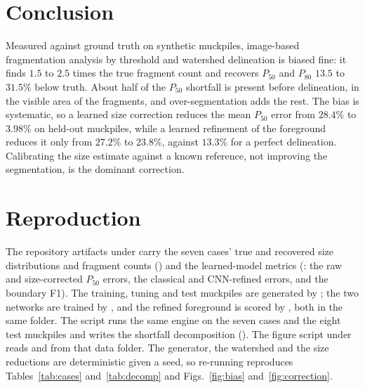 \documentclass[journal]{IEEEtran}
\begin{document}
\section{Conclusion}

Measured against ground truth on synthetic muckpiles, image-based fragmentation analysis by threshold and watershed
delineation is biased fine: it finds $1.5$ to $2.5$ times the true fragment count and recovers $P_{50}$ and $P_{80}$
$13.5$ to $31.5\%$ below truth. About half of the $P_{50}$ shortfall is present before delineation, in the visible
area of the fragments, and over-segmentation adds the rest. The bias is systematic, so a learned size correction
reduces the mean $P_{50}$ error from $28.4\%$ to $3.98\%$ on held-out muckpiles, while a learned refinement of the
foreground reduces it only from $27.2\%$ to $23.8\%$, against $13.3\%$ for a perfect delineation. Calibrating the
size estimate against a known reference, not improving the segmentation, is the dominant correction.

\appendices
\section{Reproduction}\label{app:repro}

The repository artifacts under  carry the seven cases' true and recovered size distributions
and fragment counts () and the learned-model metrics (: the raw and
size-corrected $P_{50}$ errors, the classical and CNN-refined errors, and the boundary F1). The training, tuning and
test muckpiles are generated by ; the two networks are trained by
, and the refined foreground is scored by , both in the same folder. The
script  runs the same engine on the seven cases and the eight test
muckpiles and writes the shortfall decomposition (). The figure script under
 reads  and  from that data folder.
The generator, the watershed and the size reductions are deterministic given a seed, so re-running reproduces
Tables~\ref{tab:cases} and~\ref{tab:decomp} and Figs.~\ref{fig:bias} and~\ref{fig:correction}.

\balance
\end{document}
